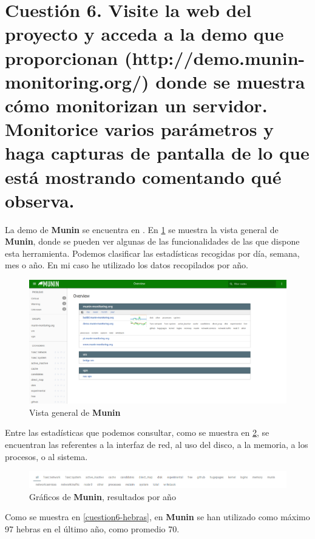 \section{Cuestión 6. Visite la web del proyecto y acceda a la demo que proporcionan (http://demo.munin-monitoring.org/) donde se muestra cómo monitorizan un servidor. Monitorice varios parámetros y haga capturas de pantalla de lo que está mostrando comentando qué observa.}

La demo de \textbf{Munin} se encuentra en \cite{munin}.
En \ref{cuestion6-overview} se muestra la vista general de \textbf{Munin}, donde se pueden ver algunas de las funcionalidades de las que dispone esta herramienta.
Podemos clasificar las estadísticas recogidas por día, semana, mes o año. En mi caso he utilizado los datos recopilados por año.

\begin{figure}[H]
	\centering
	\includegraphics[scale=0.35]{cuestion6-overview.png}
	\caption{Vista general de \textbf{Munin}} \label{cuestion6-overview}
\end{figure}

Entre las estadísticas que podemos consultar, como se muestra en \ref{cuestion6-comparaciones}, se encuentran las referentes a la interfaz de red, al uso del disco, a la memoria, a los procesos, o al sistema.

\begin{figure}[H]
	\centering
	\includegraphics[scale=0.45]{cuestion6-comparaciones.png}
	\caption{Gráficos de \textbf{Munin}, resultados por año} \label{cuestion6-comparaciones}
\end{figure}

Como se muestra en \ref{cuestion6-hebras}, en \textbf{Munin} se han utilizado como máximo 97 hebras en el último año, como promedio 70.

